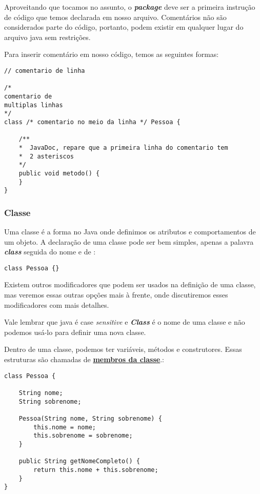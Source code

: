\documentclass[12pt]{article}
\begin{document}
Aproveitando que tocamos no assunto, o \textbf{\textit{package}} deve ser a primeira instrução de código que temos declarada em nosso arquivo. Comentários não são considerados parte do código, portanto, podem existir em qualquer lugar do arquivo java sem restrições.

\pagebreak
Para inserir comentário em nosso código, temos as seguintes formas:

\begin{lstlisting}
// comentario de linha

/*
comentario de
multiplas linhas
*/
class /* comentario no meio da linha */ Pessoa {
	
	/**
	*  JavaDoc, repare que a primeira linha do comentario tem
	*  2 asteriscos
	*/
	public void metodo() {
	}
}
\end{lstlisting}

\subsubsection{Classe}

Uma classe é a forma no Java onde definimos os atributos e comportamentos de um objeto. A declaração de uma classe pode ser bem simples, apenas a palavra \textbf{\textit{class}} seguida do nome e de \textbf{\textit{{}}}:

\begin{lstlisting}
class Pessoa {}
\end{lstlisting}

Existem outros modificadores que podem ser usados na definição de uma classe, mas veremos essas outras opções mais à frente, onde discutiremos esses modificadores com mais detalhes.

Vale lembrar que java é case \textit{sensitive} e \textbf{\textit{Class}} é o nome de uma classe e não podemos usá-lo para definir uma nova classe.

Dentro de uma classe, podemos ter variáveis, métodos e construtores. Essas estruturas são chamadas de \underline{\textbf{membros da classe}}.:

\begin{lstlisting}
class Pessoa {
	
	String nome;
	String sobrenome;
	
	Pessoa(String nome, String sobrenome) {
		this.nome = nome;
		this.sobrenome = sobrenome;
	}
	
	public String getNomeCompleto() {
		return this.nome + this.sobrenome;
	}
}	
\end{lstlisting}
\end{document}

